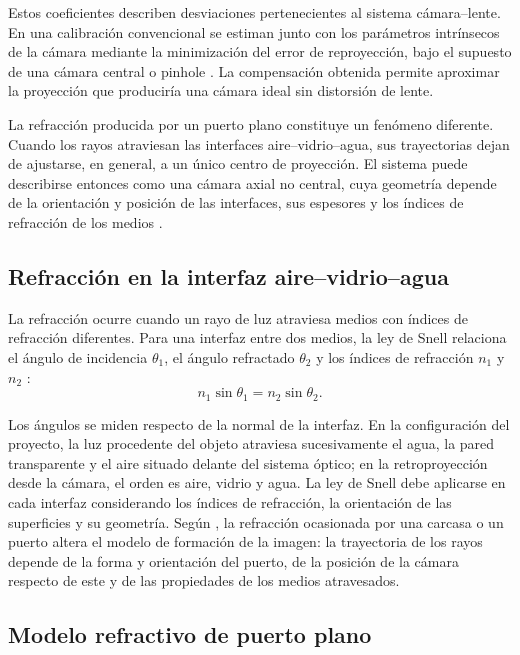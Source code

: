 \documentclass{report}
\begin{document}
Estos coeficientes describen desviaciones pertenecientes al sistema cámara--lente. En una calibración convencional se estiman junto con los parámetros intrínsecos de la cámara mediante la minimización del error de reproyección, bajo el supuesto de una cámara central o pinhole \parencite{Zhang2000}. La compensación obtenida permite aproximar la proyección que produciría una cámara ideal sin distorsión de lente.

La refracción producida por un puerto plano constituye un fenómeno diferente. Cuando los rayos atraviesan las interfaces aire--vidrio--agua, sus trayectorias dejan de ajustarse, en general, a un único centro de proyección. El sistema puede describirse entonces como una cámara axial no central, cuya geometría depende de la orientación y posición de las interfaces, sus espesores y los índices de refracción de los medios \parencite{Agrawal2012,JordtSedlazeck2012}.

\subsection{Refracción en la interfaz aire--vidrio--agua}

La refracción ocurre cuando un rayo de luz atraviesa medios con índices de refracción diferentes. Para una interfaz entre dos medios, la ley de Snell relaciona el ángulo de incidencia $\theta_1$, el ángulo refractado $\theta_2$ y los índices de refracción $n_1$ y $n_2$ \parencite{Hecht2017}:
\begin{equation}
n_1 \sin\theta_1 = n_2 \sin\theta_2 .
\label{eq:snell}
\end{equation}

Los ángulos se miden respecto de la normal de la interfaz. En la configuración del proyecto, la luz procedente del objeto atraviesa sucesivamente el agua, la pared transparente y el aire situado delante del sistema óptico; en la retroproyección desde la cámara, el orden es aire, vidrio y agua. La ley de Snell debe aplicarse en cada interfaz considerando los índices de refracción, la orientación de las superficies y su geometría. Según \textcite{Seegraber2025}, la refracción ocasionada por una carcasa o un puerto altera el modelo de formación de la imagen: la trayectoria de los rayos depende de la forma y orientación del puerto, de la posición de la cámara respecto de este y de las propiedades de los medios atravesados.

\subsection{Modelo refractivo de puerto plano}
\label{sec:puerto-plano}
\end{document}
